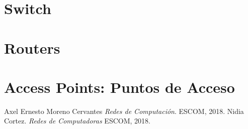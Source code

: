 \documentclass[12pt, fleqn]{report}                             %
\theoremstyle{break}                                            %
\begin{document}
    \chapter{Switch}


    \chapter{Routers}



    \chapter{Access Points: Puntos de Acceso}






\begin{thebibliography}{10}

        Axel Ernesto Moreno Cervantes
        \textit{Redes de Computación}. 
        ESCOM, 2018.
        Nidia Cortez.
        \textit{Redes de Computadoras}
        ESCOM, 2018.

\end{thebibliography}
\end{document}
